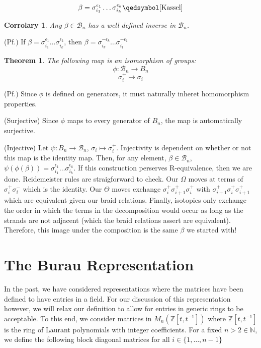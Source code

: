 \documentclass[10pt]{ucthesis}
\newcommand{\Z}{\mathbb{Z}}
\newcommand{\N}{\mathbb{N}}
\newtheorem{theorem}[definition]{Theorem}
\newtheorem{corrolary}[definition]{Corrolary}
\begin{document}
\begin{equation}
\begin{aligned}
\beta = \sigma^{\epsilon_1}_{i_1}\hdots\sigma^{\epsilon_k}_{i_k} \qedsymbol \cite{Kassel}
\end{aligned}
\end{equation}

\begin{corrolary}
	Any $\beta\in\mathcal{B}_n$ has a well defined inverse in $\mathcal{B}_n$.
\end{corrolary}

\noindent(Pf.) If $\beta = \sigma^{\epsilon_1}_{i_1}\hdots\sigma^{\epsilon_k}_{i_k}$, then $\beta = \sigma^{-\epsilon_k}_{i_k}\hdots\sigma^{-\epsilon_1}_{i_1}$ \qedsymbol \cite{Kassel}

\begin{theorem}
	The following map is an isomorphism of groups:
$$\phi:\mathcal{B}_n\rightarrow B_n$$
$$\sigma_i^+ \mapsto \sigma_i$$
\end{theorem}

\noindent(Pf.) Since $\phi$ is defined on generators, it must naturally inheret homomorphism properties. 

(Surjective) Since $\phi$ maps to every generator of $B_n$, the map is automatically surjective.

(Injective) Let $\psi:B_n\rightarrow\mathcal{B}_n$, $\sigma_i\mapsto\sigma_i^+$. Injectivity is dependent on whether or not this map is the identity map. Then, for any element, $\beta\in\mathcal{B}_n$, $\psi(\phi(\beta)) = \sigma^{\epsilon_1}_{i_1}\hdots\sigma^{\epsilon_k}_{i_k}$. If this construction perserves R-equivalence, then we are done. Reidemeister rules are straigforward to check. Our $\Omega$ moves at terms of $\sigma_i^+\sigma_i^-$ which is the identity. Our $\Theta$ moves exchange $\sigma_i^+\sigma_{i+1}^+\sigma_i^+$ with $\sigma_{i+1}^+\sigma_i^+\sigma_{i+1}^+$ which are equivalent given our braid relations. Finally, isotopies only exchange the order in which the terms in the decomposition would occur as long as the strands are not adjacent (which the braid relations assert are equivalent). Therefore, this image under the composition is the same $\beta$ we started with! \qedsymbol \cite{Kassel}

\section{The Burau Representation}


In the past, we have considered representations where the matrices have been defined to have entries in a field. For our discussion of this representation however, we will relax our definition to allow for entries in generic rings to be acceptable. To this end, we consider matrices in $M_n(\Z[t,t^{-1}])$ where $\Z[t,t^{-1}]$ is the ring of Laurant polynomials with integer coefficients. For a fixed $n>2\in\N$, we define the following block diagonal matrices for all $i\in \{1,\hdots,n-1\}$
\end{document}
